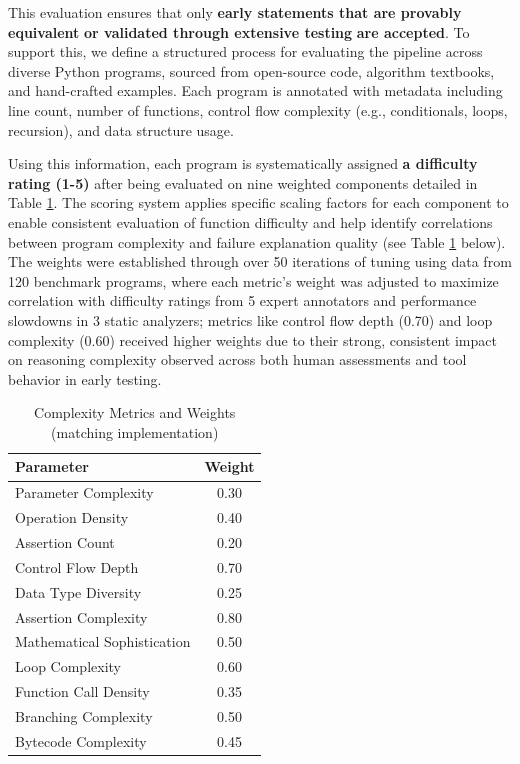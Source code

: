 \documentclass[8pt]{extarticle}
\begin{document}
This evaluation ensures that only \textbf{ early statements that are provably equivalent} \textbf{or validated through extensive testing} \textbf{are accepted}. To support this, we define a structured process for evaluating the pipeline across diverse Python programs, sourced from open-source code, algorithm textbooks, and hand-crafted examples. Each program is annotated with metadata including line count, number of functions, control flow complexity (e.g., conditionals, loops, recursion), and data structure usage.  


Using this information, each program is systematically assigned \textbf{a difficulty rating (1-5)} after being evaluated on nine weighted components detailed in Table \ref{tab:difficulty-rating}. The scoring system applies specific scaling factors for each component to enable consistent evaluation of function difficulty and help identify correlations between program complexity and failure explanation quality (see Table \ref{tab:difficulty-rating} below). The weights were established through over 50 iterations of tuning using data from 120 benchmark programs, where each metric's weight was adjusted to maximize correlation with difficulty ratings from 5 expert annotators and performance slowdowns in 3 static analyzers; metrics like control flow depth (0.70) and loop complexity (0.60) received higher weights due to their strong, consistent impact on reasoning complexity observed across both human assessments and tool behavior in early testing.


\begin{table}[H]
\centering
\begin{tabular}{|l|c|}
\hline
\textbf{Parameter} & \textbf{Weight} \\
\hline
Parameter Complexity         & 0.30 \\
Operation Density            & 0.40 \\
Assertion Count              & 0.20 \\
Control Flow Depth           & 0.70 \\
Data Type Diversity          & 0.25 \\
Assertion Complexity         & 0.80 \\
Mathematical Sophistication  & 0.50 \\
Loop Complexity              & 0.60 \\
Function Call Density        & 0.35 \\
Branching Complexity         & 0.50 \\
Bytecode Complexity          & 0.45 \\
\hline

\end{tabular}
\caption{Complexity Metrics and Weights (matching implementation)}
\label{tab:difficulty-rating}

\end{table}
\end{document}
